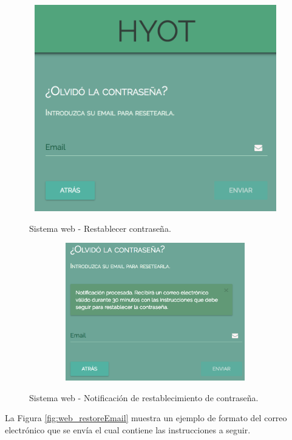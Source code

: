 \documentclass[12pt,a4paper, twoside]{report}
\begin{document}
		\begin{figure}[!ht]   
			\caption{Sistema web - Restablecer contraseña.} 
			\begin{center} 
	 			\includegraphics[width=11cm, height=9cm]{Images/userGuide/web/restorePassword} \\
				\label{fig:web_restorePassword} 
			\end{center}  	
		\end{figure}	
		
		\begin{figure}[!ht]   
			\caption{Sistema web - Notificación de restablecimiento de contraseña.} 
			\begin{center} 
	 			\includegraphics[width=11cm, height=6cm]{Images/userGuide/web/notificationRestorePassword} \\
				\label{fig:web_restoreAlert} 
			\end{center}  	
		\end{figure}

	 La Figura \ref{fig:web_restoreEmail} muestra un ejemplo de formato del correo electrónico que se envía el cual contiene las instrucciones a seguir.   \\
\end{document}

